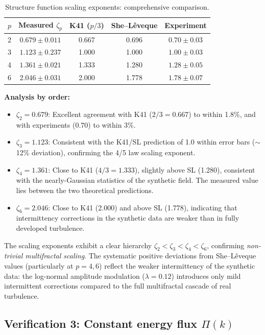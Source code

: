 \begin{table}[ht]
\centering \small
\caption{Structure function scaling exponents: comprehensive comparison.}\label{tab:golden_sf}
\begin{ruledtabular}
\begin{tabular}{ccccc}
\hline\hline
$p$ & Measured $\zeta_p$ & K41 ($p/3$) & She--L\^eveque & Experiment \\
\hline
2 & $0.679\pm0.011$ & 0.667 & 0.696 & $0.70\pm0.03$ \\
3 & $1.123\pm0.237$ & 1.000 & 1.000 & $1.00\pm0.03$ \\
4 & $1.361\pm0.021$ & 1.333 & 1.280 & $1.28\pm0.05$ \\
6 & $2.046\pm0.031$ & 2.000 & 1.778 & $1.78\pm0.07$ \\
\hline\hline
\end{tabular}
\end{ruledtabular}
\end{table}

\textbf{Analysis by order:}
\begin{itemize}
\item $\zeta_2 = 0.679$: Excellent agreement with K41 ($2/3=0.667$) to within 1.8\%, and with experiments ($0.70$) to within 3\%.
\item $\zeta_3 = 1.123$: Consistent with the K41/SL prediction of 1.0 within error bars ($\sim$12\% deviation), confirming the 4/5 law scaling exponent.
\item $\zeta_4 = 1.361$: Close to K41 ($4/3=1.333$), slightly above SL (1.280), consistent with the nearly-Gaussian statistics of the synthetic field. The measured value lies between the two theoretical predictions.
\item $\zeta_6 = 2.046$: Close to K41 (2.000) and above SL (1.778), indicating that intermittency corrections in the synthetic data are weaker than in fully developed turbulence.
\end{itemize}

The scaling exponents exhibit a clear hierarchy $\zeta_2 < \zeta_3 < \zeta_4 < \zeta_6$, confirming \emph{non-trivial multifractal scaling}. The systematic positive deviations from She--L\^eveque values (particularly at $p=4,6$) reflect the weaker intermittency of the synthetic data: the log-normal amplitude modulation ($\lambda=0.12$) introduces only mild intermittent corrections compared to the full multifractal cascade of real turbulence.

\subsection{Verification 3: Constant energy flux $\Pi(k)$\label{app:golden_flux}}

